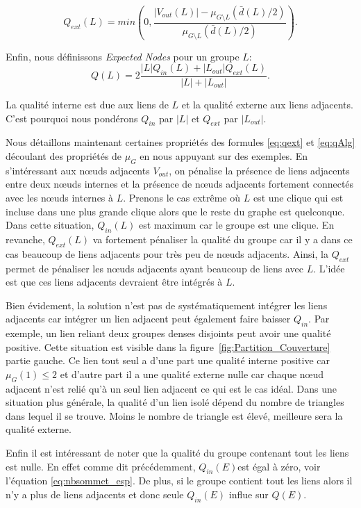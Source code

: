 \begin{equation}
\label{eq:qext} Q_{ext}(L) = min \left(0, \dfrac{|V_{out}(L)| - \mu_{G\setminus L}(\bar{d}(L)/2)}{\mu_{G\setminus L}(\bar{d}(L)/2)} \right).
\end{equation}


Enfin, nous définissons \emph{Expected Nodes} pour un groupe $L$:
\begin{equation}
	\label{eq:qAlg}
	Q(L)  =  2\dfrac{ |L|Q_{in}(L) + |L_{out}|Q_{ext}(L)}{|L|+|L_{out}|}.
\end{equation}

La qualité interne est due aux liens de $L$ et la qualité externe aux liens adjacents.
C'est pourquoi nous pondérons $Q_{in}$ par $|L|$ et $Q_{ext}$ par $|L_{out}|$.



Nous détaillons maintenant certaines propriétés des formules \ref{eq:qext} et \ref{eq:qAlg} découlant des propriétés de $\mu_{G}$ en nous appuyant sur des exemples.
En s'intéressant aux n\oe uds adjacents $V_{out}$, on pénalise la présence de liens adjacents entre deux n\oe uds internes et la présence de n\oe uds adjacents fortement connectés avec les n\oe uds internes à $L$.
Prenons le cas extrême où $L$ est une clique qui est incluse dans une plus grande clique alors que le reste du graphe est quelconque.
Dans cette situation, $Q_{in}(L)$ est maximum car le groupe est une clique.
En revanche, $Q_{ext}(L)$ va fortement pénaliser la qualité du groupe car il y a dans ce cas beaucoup de liens adjacents pour très peu de n\oe uds adjacents.
Ainsi, la $Q_{ext}$ permet de pénaliser les n\oe uds adjacents ayant beaucoup de liens avec $L$.
L'idée est que ces liens adjacents devraient être intégrés à $L$.

Bien évidement, la solution n'est pas de systématiquement intégrer les liens adjacents car intégrer un lien adjacent peut également faire baisser $Q_{in}$.
Par exemple, un lien reliant deux groupes denses disjoints peut avoir une qualité positive.
Cette situation est visible dans la figure~\ref{fig:Partition_Couverture} partie gauche.
Ce lien tout seul a d'une part une qualité interne positive car $\mu_G(1) \leq 2$ et d'autre part il a une qualité externe nulle car chaque n\oe ud adjacent n'est relié qu'à un seul lien adjacent ce qui est le cas idéal.
Dans une situation plus générale, la qualité d'un lien isolé dépend du nombre de triangles dans lequel il se trouve.
Moins le nombre de triangle est élevé, meilleure sera la qualité externe.

Enfin il est intéressant de noter que la qualité du groupe contenant tout les liens est nulle.
En effet comme dit précédemment, $Q_{in}(E)$est  égal à zéro, voir l'équation \ref{eq:nbsommet_esp}.
De plus, si le groupe contient tout les liens alors il n'y a plus de liens adjacents et donc seule  $Q_{in}(E)$ influe sur $Q(E)$.



